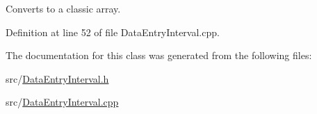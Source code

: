 Converts to a classic array. 



Definition at line 52 of file Data\+Entry\+Interval.\+cpp.



The documentation for this class was generated from the following files\+:\begin{DoxyCompactItemize}
\item 
src/\hyperlink{DataEntryInterval_8h}{Data\+Entry\+Interval.\+h}\item 
src/\hyperlink{DataEntryInterval_8cpp}{Data\+Entry\+Interval.\+cpp}\end{DoxyCompactItemize}
